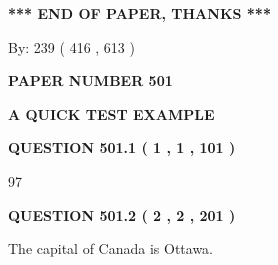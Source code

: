 \documentclass[12pt]{article}
\begin{document}
 
 
 
   
   
 \vspace{0.2in}
 
   
   
   
   
\vspace{1.0in} 
{\textbf{\large{ *** END OF PAPER, THANKS *** }}} 
   
   
\hspace{1.0in} By: 
 239 ( 416 ,  613 )
   
   
   
   
\newpage 
\setcounter{page}{ 
   501001 } 
   
   
   
   
 {\textbf{ \Large{ PAPER NUMBER  501  }}}
   
   
\vspace{0.2in}
   
   
   
   
   
   
 \vspace{0.2in}
{\LARGE {\textbf{ A QUICK TEST EXAMPLE}}}
   
   
  
\vspace{0.2in}
  
{\textbf{\Large{QUESTION
501.1 
 ( 1 , 1 , 101 )
}}}
  
  
 
 
\noindent{}

97
 
 
  
\vspace{0.2in}
  
{\textbf{\Large{QUESTION
501.2 
 ( 2 , 2 , 201 )
}}}
  
  
 
 
\noindent{}
 
 
The capital of Canada is Ottawa.
 
 
 
 
   
   
 \vspace{0.2in}
 
   
   
   
   
\end{document}
